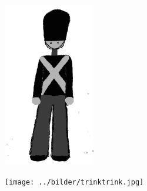 
\sclearpage


\begin{intersong}
	\begin{center}
		\includegraphics[width=0.3\textwidth]{../bilder/fardigabilder/CamillasFardigaBilder/EnDanskAquavit2.png} 
	\end{center}
\end{intersong}


\sclearpage



\begin{intersong}
\begin{center}
\texttt{[image: ../bilder/trinktrink.jpg]} 
\end{center}
\end{intersong}
\sclearpage





\sclearpage